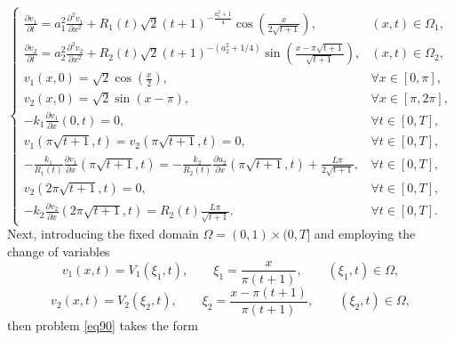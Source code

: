 \documentclass[preprint,12pt,authoryear]{elsarticle}
\begin{document}
\begin{equation}\label{eq90}
    \begin{cases}
        \frac{\partial v_1}{\partial t}=a_1^2\frac{\partial^2 v_1}{\partial x^2}+R_1(t)\sqrt{2}(t+1)^{-\frac{a_1^2+1}{4}}\cos\left(\frac{x}{2\sqrt{t+1}}\right),&(x,t)\in\Omega_1,\\
        \frac{\partial v_2}{\partial t}=a_2^2\frac{\partial^2 v_2}{\partial x^2}+R_2(t)\sqrt{2}(t+1)^{-(a_2^2+1/4)}\sin\left(\frac{x-\pi\sqrt{t+1}}{\sqrt{t+1}}\right),&(x,t)\in\Omega_2,\\
        v_1(x,0)=\sqrt{2}\cos\left(\frac{x}{2}\right),&\forall x\in[0,\pi],\\
        v_2(x,0)=\sqrt{2}\sin\left(x-\pi\right),&\forall x\in[\pi,2\pi],\\
        -k_1\frac{\partial v_1}{\partial x}(0,t)=0,&\forall t\in[0,T],\\
        v_1(\pi\sqrt{t+1},t)=v_2(\pi\sqrt{t+1},t)=0,&\forall t\in[0,T],\\
        -\frac{k_1}{R_1(t)}\frac{\partial v_1}{\partial x}(\pi\sqrt{t+1},t)=-\frac{k_2}{R_2(t)}\frac{\partial u_2}{\partial x}(\pi\sqrt{t+1},t)+\frac{L\pi}{2\sqrt{t+1}},&\forall t\in[0,T],\\
        v_2(2\pi\sqrt{t+1},t)=0,&\forall t\in[0,T],\\
        -k_2\frac{\partial v_2}{\partial x}(2\pi\sqrt{t+1},t)=R_2(t)\frac{L\pi}{\sqrt{t+1}}.&\forall t\in[0,T].
    \end{cases}
\end{equation}
Next, introducing the fixed domain $\Omega=(0,1)\times(0,T]$ and employing the change of variables
\begin{equation}\label{eq91}
    v_1(x,t)=V_1(\xi_1,t),\quad\quad \xi_1=\frac{x}{\pi(t+1)},\quad\quad (\xi_1,t)\in\Omega,
\end{equation}
\begin{equation}\label{eq92}
    v_2(x,t)=V_2(\xi_2,t),\quad\quad \xi_2=\frac{x-\pi(t+1)}{\pi(t+1)},\quad\quad (\xi_2,t)\in\Omega,
\end{equation}
then problem \eqref{eq90} takes the form
\end{document}
